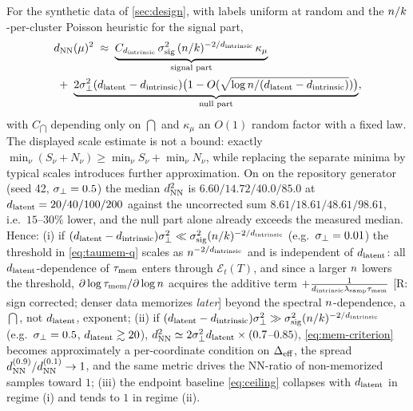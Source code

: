 \begin{corollary}\label{cor:dnn-scaling}
For the synthetic data of \cref{sec:design}, with labels uniform at random and the $n/k$-per-cluster Poisson heuristic for the signal part,
\begin{equation}\label{eq:dnn-scaling}
\begin{aligned}
&d_{\rm NN}(\mu)^2\;\approx\;\underbrace{C_{d_{\mathrm{intrinsic}}}\,\sigma_{\mathrm{sig}}^2\,(n/k)^{-2/d_{\mathrm{intrinsic}}}\,\kappa_\mu}_{\text{signal part}}\\ &\;+\;\underbrace{2\sigma_{\perp}^2(d_{\mathrm{latent}}-d_{\mathrm{intrinsic}})\big(1-O(\sqrt{\log n/(d_{\mathrm{latent}}-d_{\mathrm{intrinsic}})})\big)}_{\text{null part}},
\end{aligned}
\end{equation}
with $C_{\dint}$ depending only on $\dint$ and $\kappa_\mu$ an $O(1)$ random factor with a fixed law. The displayed scale estimate is not a bound: exactly $\min_\nu(S_\nu+N_\nu)\ge\min_\nu S_\nu+\min_\nu N_\nu$, while replacing the separate minima by typical scales introduces further approximation. On on the repository generator (seed 42, $\sigma_{\perp}=0.5$) the median $d_{\rm NN}^2$ is $6.60/14.72/40.0/85.0$ at $d_{\mathrm{latent}}=20/40/100/200$ against the uncorrected sum $8.61/18.61/48.61/98.61$, i.e.\ $15$--$30\%$ lower, and the null part alone already exceeds the measured median. Hence: (i) if $(d_{\mathrm{latent}}-d_{\mathrm{intrinsic}})\sigma_{\perp}^2\ll\sigma_{\mathrm{sig}}^2(n/k)^{-2/d_{\mathrm{intrinsic}}}$ (e.g.\ $\sigma_{\perp}=0.01$) the threshold in \eqref{eq:taumem-q} scales as $n^{-2/d_{\mathrm{intrinsic}}}$ and is independent of $d_{\mathrm{latent}}$: all $d_{\mathrm{latent}}$-dependence of $\tau_{\mathrm{mem}}$ enters through $\mathcal E_t(T)$, and since a larger $n$ lowers the threshold, $\partial\log\tau_{\mathrm{mem}}/\partial\log n$ acquires the additive term $+\frac{1}{d_{\mathrm{intrinsic}}\lambda_{\rm samp}\tau_{\mathrm{mem}}}$ [R: sign corrected; denser data memorizes \emph{later}] beyond the spectral $n$-dependence, a $\dint$, not $d_{\mathrm{latent}}$, exponent; (ii) if $(d_{\mathrm{latent}}-d_{\mathrm{intrinsic}})\sigma_{\perp}^2\gg\sigma_{\mathrm{sig}}^2(n/k)^{-2/d_{\mathrm{intrinsic}}}$ (e.g.\ $\sigma_{\perp}=0.5$, $d_{\mathrm{latent}}\gtrsim20$), $d_{\rm NN}^2\simeq2\sigma_{\perp}^2d_{\mathrm{latent}}\times(0.7$--$0.85)$, \eqref{eq:mem-criterion} becomes approximately a per-coordinate condition on $\Delta_{\rm eff}$, the spread $d^{(0.9)}_{\rm NN}/d^{(0.1)}_{\rm NN}\to1$, and the same metric drives the NN-ratio of non-memorized samples toward $1$; (iii) the endpoint baseline \eqref{eq:ceiling} collapses with $d_{\mathrm{latent}}$ in regime (i) and tends to $1$ in regime (ii).
\end{corollary}
